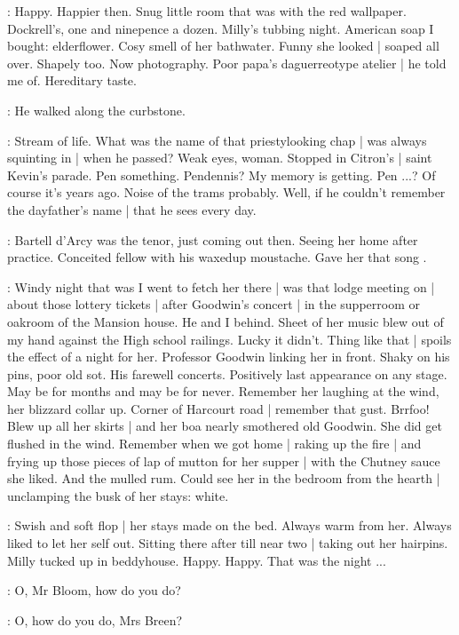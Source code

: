 \BloomInt:
Happy.
Happier then.
Snug little room that was with the red wallpaper.
Dockrell's, one and ninepence a dozen.
Milly's tubbing night.
American soap I bought:
elderflower.
Cosy smell of her bathwater.
Funny she looked |
soaped all over.
Shapely too.
Now photography.
Poor papa's daguerreotype atelier |
he told me of.
Hereditary taste.

:
He walked along the curbstone.

\BloomInt:
Stream of life.
What was the name of that priestylooking chap |
was always squinting in |
when he passed?
Weak eyes,
woman.
Stopped in Citron's |
saint Kevin's parade.
Pen something.
Pendennis?
My memory is getting.
Pen ...?
Of course it's years ago.
Noise of the trams probably.
Well, if he couldn't remember the dayfather's name |
that he sees every day.

\BloomInt:
Bartell d'Arcy was the tenor,
just coming out then.
Seeing her home after practice.
Conceited fellow with his waxedup moustache.
Gave her that song
.

\BloomInt:
Windy night that was I went to fetch her there |
was that lodge meeting on |
about those lottery tickets |
after Goodwin's concert |
in the supperroom or oakroom of the Mansion house.
He and I behind.
Sheet of her music blew out of my hand
against the High school railings.
Lucky it didn't.
Thing like that |
spoils the effect of a night for her.
Professor Goodwin linking her in front.
Shaky on his pins,
poor old sot.
His farewell concerts.
Positively last appearance on any stage.
May be for months and may be for never.
Remember her laughing at the wind,
her blizzard collar up.
Corner of Harcourt road |
remember that gust.
Brrfoo!
Blew up all her skirts |
and her boa nearly smothered old Goodwin.
She did get flushed in the wind.
Remember when we got home |
raking up the fire |
and frying up those pieces of lap of mutton for her supper |
with the Chutney sauce she liked.
And the mulled rum.
Could see her in the bedroom from the hearth |
unclamping the busk of her stays:
white.

\BloomInt:
Swish and soft flop |
her stays made on the bed.
Always warm from her.
Always liked to let her self out.
Sitting there after till near two |
taking out her hairpins.
Milly tucked up in beddyhouse.
Happy.
Happy.
That was the night ...

\josie:
O, Mr Bloom, how do you do?

\Bloom:
O, how do you do, Mrs Breen?

